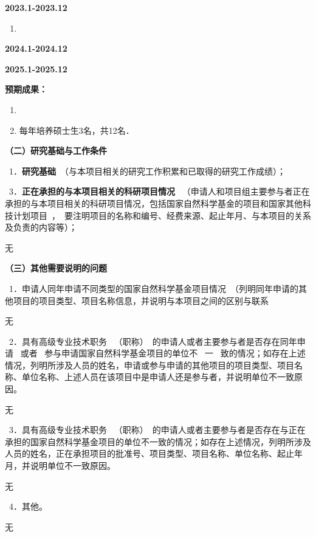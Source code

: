 \documentclass[UTF8,A4]{ctexart}
\newcommand{\blue}{\textcolor[rgb]{0.00,0.44,0.75}}
\begin{document}
\noindent\textbf{2023.1-2023.12}
\begin{enumerate}
  \item
\end{enumerate}


\noindent\textbf{2024.1-2024.12}



\noindent\textbf{2025.1-2025.12}




\textbf{预期成果：}

\begin{enumerate}
  \item
  \item 每年培养硕士生3名，共12名．
\end{enumerate}

\pagebreak[4]
\begin{spacing}{1.6}
\kaishu
\blue{\textbf{（二）研究基础与工作条件}}

\blue{~1．\textbf{研究基础}~（与本项目相关的研究工作积累和已取得的研究工作成绩）；}
\end{spacing}






\pagebreak[4]
\begin{spacing}{1.6}
\kaishu
\blue{~3．\textbf{正在承担的与本项目相关的科研项目情况}~ （申请人和项目组主要参与者正在承担的与本项目相关的科研项目情况，包括国家自然科学基金的项目和国家其他科技计划项目~，~要注明项目的名称和编号、经费来源、起止年月、与本项目的关系及负责的内容等）；}
\end{spacing}
无
\begin{spacing}{1.6}
\kaishu

\end{spacing}
\pagebreak[4]
\begin{spacing}{1.6}
\kaishu
\blue{\textbf{（三）其他需要说明的问题}}

\blue{~1．申请人同年申请不同类型的国家自然科学基金项目情况~（列明同年申请的其他项目的项目类型、项目名称信息，并说明与本项目之间的区别与联系}
\end{spacing}
无

\begin{spacing}{1.6}
\kaishu
\blue{~2．具有高级专业技术职务~ （职称）~的申请人或者主要参与者是否存在同年申请~ 或者~ 参与申请国家自然科学基金项目的单位不~ 一~ 致的情况；如存在上述情况，列明所涉及人员的姓名，申请或参与申请的其他项目的项目类型、项目名称、单位名称、上述人员在该项目中是申请人还是参与者，并说明单位不一致原因。}
\end{spacing}
无
\begin{spacing}{1.6}
\kaishu
\blue{~3．具有高级专业技术职务~ （职称）~的申请人或者主要参与者是否存在与正在承担的国家自然科学基金项目的单位不一致的情况；如存在上述情况，列明所涉及人员的姓名，正在承担项目的批准号、项目类型、项目名称、单位名称、起止年月，并说明单位不一致原因。}
\end{spacing}
无
\begin{spacing}{1.6}
\kaishu
\blue{~4．其他。}
\end{spacing}
无
\end{document}
